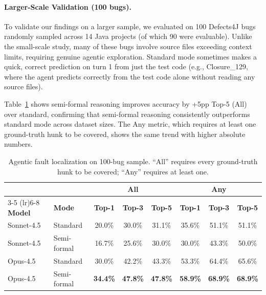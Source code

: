 \documentclass[]{meta}
\begin{document}
\paragraph{Larger-Scale Validation (100 bugs).}
To validate our findings on a larger sample, we evaluated on 100 Defects4J bugs randomly sampled across 14 Java projects (of which 90 were evaluable). Unlike the small-scale study, many of these bugs involve source files exceeding context limits, requiring genuine agentic exploration. Standard mode sometimes makes a quick, correct prediction on turn 1 from just the test code (e.g., Closure\_129, where the agent predicts correctly from the test code alone without reading any source files).

Table~\ref{tab:fl-58} shows semi-formal reasoning improves accuracy by +5pp Top-5 (All) over standard, confirming that semi-formal reasoning consistently outperforms standard mode across dataset sizes. The Any metric, which requires at least one ground-truth hunk to be covered, shows the same trend with higher absolute numbers.

\begin{table}[h]
\centering
\caption{Agentic fault localization on 100-bug sample. ``All'' requires every ground-truth hunk to be covered; ``Any'' requires at least one.}
\label{tab:fl-58}
\begin{tabular}{llcccccc}
\toprule
 & & \multicolumn{3}{c}{\textbf{All}} & \multicolumn{3}{c}{\textbf{Any}} \\
\cmidrule(lr){3-5} \cmidrule(lr){6-8}
\textbf{Model} & \textbf{Mode} & \textbf{Top-1} & \textbf{Top-3} & \textbf{Top-5} & \textbf{Top-1} & \textbf{Top-3} & \textbf{Top-5} \\
\midrule
Sonnet-4.5 & Standard & 20.0\% & 30.0\% & 31.1\% & 35.6\% & 51.1\% & 51.1\% \\
Sonnet-4.5 & Semi-formal & 16.7\% & 25.6\% & 30.0\% & 30.0\% & 43.3\% & 50.0\% \\
Opus-4.5 & Standard & 30.0\% & 42.2\% & 43.3\% & 53.3\% & 64.4\% & 65.6\% \\
Opus-4.5 & Semi-formal & \textbf{34.4\%} & \textbf{47.8\%} & \textbf{47.8\%} & \textbf{58.9\%} & \textbf{68.9\%} & \textbf{68.9\%} \\
\bottomrule
\end{tabular}
\end{table}
\end{document}
